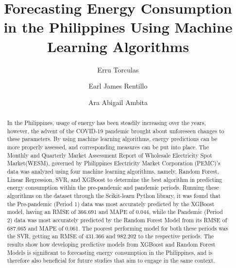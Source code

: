 \documentclass[runningheads]{llncs}
\begin{document}
%
\title{Forecasting Energy Consumption in the Philippines Using Machine Learning Algorithms}
%
%
\author{Erru Torculas \and
Earl James Rentillo \and
Ara Abigail Ambita}
%
%
%
\maketitle              %
%
\begin{abstract}
In the Philippines, usage of energy has been steadily increasing over the years, however, the advent of the COVID-19 pandemic brought about unforeseen changes to these parameters. By using machine learning algorithms, energy predictions can be more properly assessed, and corresponding measures can be put into place. The Monthly and Quarterly Market Assessment Report of Wholesale Electricity Spot Market(WESM), governed by Philippines Electricity Market Corporation  (PEMC)'s data was analyzed using four machine learning algorithms, namely, Random Forest, Linear Regression, SVR, and XGBoost to determine the best algorithm in predicting energy consumption within the pre-pandemic and pandemic periods. Running these algorithms on the dataset through the Scikit-learn Python library, it was found that the Pre-pandemic (Period 1) data  was most accurately predicted by the XGBoost model, having an RMSE of 366.691 and MAPE of 0.044, while the Pandemic (Period 2) data was most accurately predicted by the Random Forest Model from its RMSE of 687.665 and MAPE of 0.061. The poorest performing model for both these periods was the SVR, getting an RMSE of 431.366 and 982.202 to the respective periods. The results show how developing predictive models from XGBoost and Random Forest Models is significant to forecasting energy consumption in the Philippines, and is therefore also beneficial for future studies that aim to engage in the same context.

\end{abstract}
%
%
%
\end{document}
